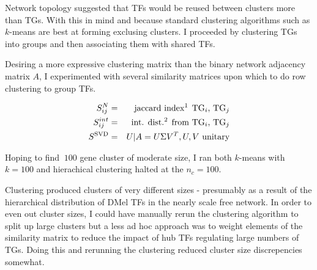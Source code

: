 \documentclass[12pt,a4paper]{article}
\begin{document}
\begin{multicols}{2}
Network topology suggested that TFs would be reused between clusters more than TGs. With this in mind and because standard clustering algorithms such as $k$-means are best at forming exclusing clusters. I proceeded by clustering TGs into groups and then associating them with shared TFs.

Desiring a more expressive clustering matrix than the binary network adjacency matrix $A$, I experimented with several similarity matrices upon which to do row clustering to group TFs.

\begin{eqnarray*}
S_{ij}^{N} &=& \text{jaccard index\footnotemark \hspace{1ex}TG$_i$, TG$_j$}\\
S_{ij}^{int}&=& \text{int. dist.\footnotemark \hspace{1ex}from TG$_i$, TG$_j$}\\
S^{\text{SVD}} &=& U | A = U\Sigma V^T, U,V \text{ unitary}
\end{eqnarray*}
\addtocounter{footnote}{-2}

Hoping to find $~100$ gene cluster of moderate size, I ran both $k$-means with $k=100$ and hierachical clustering halted at the $n_c = 100$.

Clustering produced clusters of very different sizes - presumably as a result of the hierarchical distribution of DMel TFs in the nearly scale free network. In order to even out cluster sizes, I could have manually rerun the clustering algorithm to split up large clusters but a less ad hoc approach was to weight elements of the similarity matrix to reduce the impact of hub TFs regulating large numbers of TGs. Doing this and rerunning the clustering reduced cluster size discrepencies somewhat.


\end{multicols}
\end{document}
